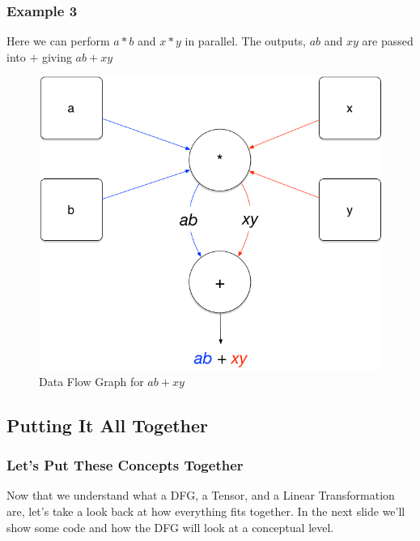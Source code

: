 \documentclass{beamer}
\begin{document}
\begin{frame}
  \frametitle{Example 3}

  Here we can perform $a * b$ and $x * y$ in parallel.  The outputs,
  $ab$ and $xy$ are passed into $+$ giving $ab + xy$
  \begin{figure}
    \includegraphics[scale=0.25]{img/ab_plus_xy}
    \caption{Data Flow Graph for $ab + xy$}
  \end{figure}
\end{frame}

\subsection{Putting It All Together}

\begin{frame}
  \frametitle{Let's Put These Concepts Together}

  Now that we understand what a DFG, a Tensor, and a Linear
  Transformation are, let's take a look back at how everything fits
  together.  In the next slide we'll show some code and how the DFG
  will look at a conceptual level.
\end{frame}
\end{document}
